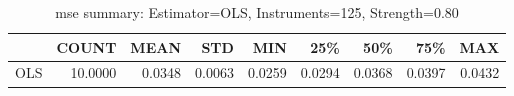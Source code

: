 \begin{table}[ht]
\centering
\caption{mse summary: Estimator=OLS, Instruments=125, Strength=0.80}
\begin{tabular}{lrrrrrrrr}
\toprule
 & COUNT & MEAN & STD & MIN & 25\% & 50\% & 75\% & MAX \\
\midrule
OLS & 10.0000 & 0.0348 & 0.0063 & 0.0259 & 0.0294 & 0.0368 & 0.0397 & 0.0432 \\
\bottomrule
\end{tabular}
\end{table}
